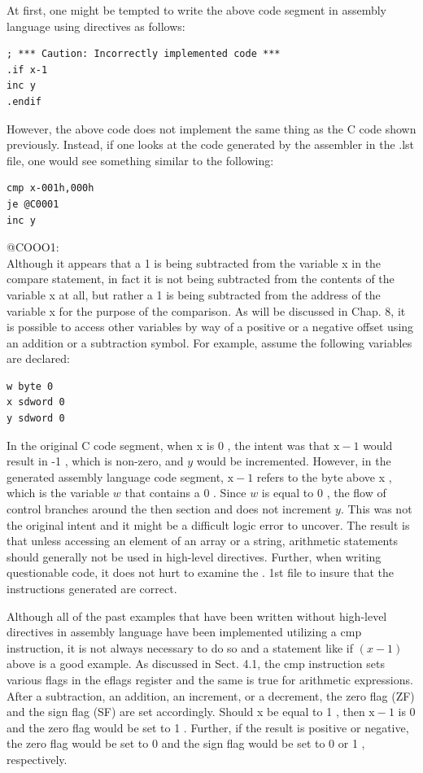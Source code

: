 \documentclass[10pt]{book}
\begin{document}
At first, one might be tempted to write the above code segment in assembly language using directives as follows:

\begin{verbatim}
; *** Caution: Incorrectly implemented code ***
.if x-1
inc y
.endif
\end{verbatim}

However, the above code does not implement the same thing as the C code shown previously. Instead, if one looks at the code generated by the assembler in the .lst file, one would see something similar to the following:

\begin{verbatim}
cmp x-001h,000h
je @C0001
inc y
\end{verbatim}

@COOO1:\\
Although it appears that a 1 is being subtracted from the variable x in the compare statement, in fact it is not being subtracted from the contents of the variable x at all, but rather a 1 is being subtracted from the address of the variable x for the purpose of the comparison. As will be discussed in Chap. 8, it is possible to access other variables by way of a positive or a negative offset using an addition or a subtraction symbol. For example, assume the following variables are declared:

\begin{verbatim}
w byte 0
x sdword 0
y sdword 0
\end{verbatim}

In the original C code segment, when x is 0 , the intent was that $\mathrm{x}-1$ would result in -1 , which is non-zero, and $y$ would be incremented. However, in the generated assembly language code segment, $\mathrm{x}-1$ refers to the byte above x , which is the variable $w$ that contains a 0 . Since $w$ is equal to 0 , the flow of control branches around the then section and does not increment $y$. This was not the original intent and it might be a difficult logic error to uncover. The result is that unless accessing an element of an array or a string, arithmetic statements should generally not be used in high-level directives. Further, when writing questionable code, it does not hurt to examine the . 1st file to insure that the instructions generated are correct.

Although all of the past examples that have been written without high-level directives in assembly language have been implemented utilizing a cmp instruction, it is not always necessary to do so and a statement like if $(x-1)$ above is a good example. As discussed in Sect. 4.1, the cmp instruction sets various flags in the eflags register and the same is true for arithmetic expressions. After a subtraction, an addition, an increment, or a decrement, the zero flag (ZF) and the sign flag (SF) are set accordingly. Should x be equal to 1 , then $\mathrm{x}-1$ is 0 and the zero flag would be set to 1 . Further, if the result is positive or negative, the zero flag would be set to 0 and the sign flag would be set to 0 or 1 , respectively.
\end{document}
